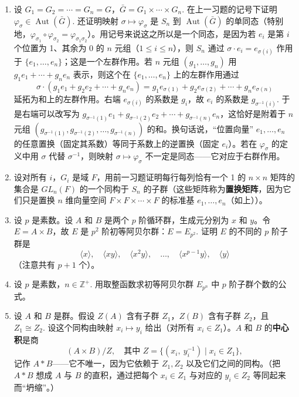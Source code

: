 \begin{enumerate}
\item 设 \(G_1 = G_2 = \cdots = G_n = G\)，\(\bar{G} = G_1 \times \cdots \times G_n\). 在上一习题的记号下证明 \(\varphi_\sigma \in \operatorname{Aut}(\bar{G})\). 还证明映射 \(\sigma \mapsto \varphi_\sigma\) 是 \(S_n\) 到 \(\operatorname{Aut}(\bar{G})\) 的单同态（特别地，\(\varphi_{\sigma_1} \circ \varphi_{\sigma_2} = \varphi_{\sigma_1\sigma_2}\)）。用记号来说这之所以是一个同态，是因为若 \(e_i\) 是第 \(i\) 个位置为 1、其余为 0 的 \(n\) 元组（\(1 \leq i \leq n\)），则 \(S_n\) 通过 \(\sigma \cdot e_i = e_{\sigma(i)}\) 作用于 \(\{e_1, \ldots, e_n\}\)；这是一个左群作用。若 \(n\) 元组 \((g_1, \ldots, g_n)\) 用 \(g_1e_1 + \cdots + g_ne_n\) 表示，则这个在 \(\{e_1, \ldots, e_n\}\) 上的左群作用通过
\[
\sigma \cdot (g_1e_1 + g_2e_2 + \cdots + g_ne_n) = g_1e_{\sigma(1)} + g_2e_{\sigma(2)} + \cdots + g_ne_{\sigma(n)}
\]
延拓为和上的左群作用。右端 \(e_{\sigma(i)}\) 的系数是 \(g_i\)，故 \(e_i\) 的系数是 \(g_{\sigma^{-1}(i)}\). 于是右端可以改写为 \(g_{\sigma^{-1}(1)}e_1 + g_{\sigma^{-1}(2)}e_2 + \cdots + g_{\sigma^{-1}(n)}e_n\)，这恰好是附着于 \(n\) 元组 \((g_{\sigma^{-1}(1)}, g_{\sigma^{-1}(2)}, \ldots, g_{\sigma^{-1}(n)})\) 的和。换句话说，“位置向量” \(e_1, \ldots, e_n\) 的任意置换（固定其系数）等同于系数上的逆置换（固定 \(e_i\)）。若在 \(\varphi_\sigma\) 的定义中用 \(\sigma\) 代替 \(\sigma^{-1}\)，则映射 \(\sigma \mapsto \varphi_\sigma\) 不一定是同态——它对应于右群作用。

\item 设对所有 \(i\)，\(G_i\) 是域 \(F\)，用前一习题证明每行每列恰有一个 1 的 \(n \times n\) 矩阵的集合是 \(GL_n(F)\) 的一个同构于 \(S_n\) 的子群（这些矩阵称为\textbf{置换矩阵}，因为它们只是置换 \(n\) 维向量空间 \(F \times F \times \cdots \times F\) 的标准基 \(e_1, \ldots, e_n\)（如上））。

\item 设 \(p\) 是素数。设 \(A\) 和 \(B\) 是两个 \(p\) 阶循环群，生成元分别为 \(x\) 和 \(y\)。令 \(E = A \times B\)，故 \(E\) 是 \(p^2\) 阶初等阿贝尔群：\(E = E_{p^2}\). 证明 \(E\) 的不同的 \(p\) 阶子群是
\[
\langle x \rangle,\quad \langle xy \rangle,\quad \langle x^2 y \rangle,\quad \ldots,\quad \langle x^{p-1}y \rangle,\quad \langle y \rangle
\]
（注意共有 \(p+1\) 个）。

\item 设 \(p\) 是素数，\(n \in \mathbb{Z}^+\). 用取整函数求初等阿贝尔群 \(E_{p^n}\) 中 \(p\) 阶子群个数的公式。

\item 设 \(A\) 和 \(B\) 是群。假设 \(Z(A)\) 含有子群 \(Z_1\)，\(Z(B)\) 含有子群 \(Z_2\)，且 \(Z_1 \cong Z_2\). 设这个同构由映射 \(x_i \mapsto y_i\) 给出（对所有 \(x_i \in Z_1\)）。\(A\) 和 \(B\) 的\textbf{中心积}是商
\[
(A \times B)/Z, \quad \text{其中 } Z = \{(x_i,\ y_i^{-1}) \mid x_i \in Z_1\},
\]
记作 \(A * B\)——它不唯一，因为它依赖于 \(Z_1, Z_2\) 以及它们之间的同构。（把 \(A * B\) 想成 \(A\) 与 \(B\) 的直积，通过把每个 \(x_i \in Z_1\) 与对应的 \(y_i \in Z_2\) 等同起来而“坍缩”。）


\end{enumerate}
